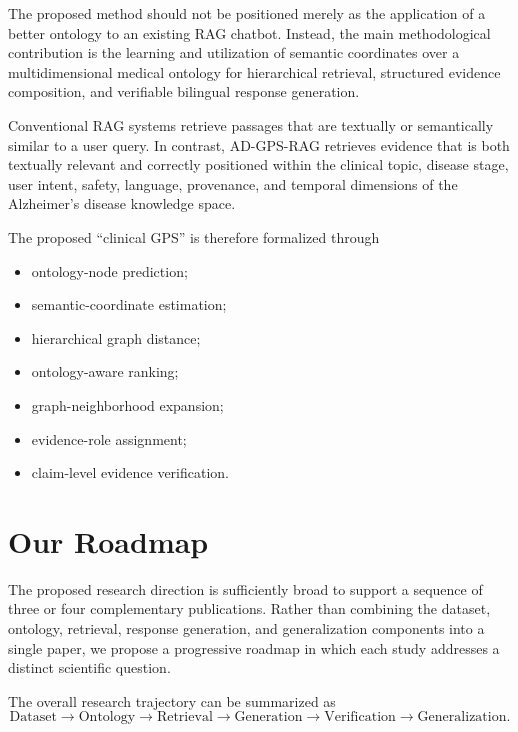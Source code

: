 \documentclass{article}
\begin{document}
The proposed method should not be positioned merely as the application of a better ontology to an existing RAG chatbot. Instead, the main methodological contribution is the learning and utilization of semantic coordinates over a multidimensional medical ontology for hierarchical retrieval, structured evidence composition, and verifiable bilingual response generation.

Conventional RAG systems retrieve passages that are textually or semantically similar to a user query. In contrast, AD-GPS-RAG retrieves evidence that is both textually relevant and correctly positioned within the clinical topic, 
disease stage, user intent, safety, language, provenance, and temporal dimensions of the Alzheimer's disease knowledge space.

The proposed ``clinical GPS'' is therefore formalized through
\begin{itemize}
    \item ontology-node prediction;
    \item semantic-coordinate estimation;
    \item hierarchical graph distance;
    \item ontology-aware ranking;
    \item graph-neighborhood expansion;
    \item evidence-role assignment;
    \item claim-level evidence verification.
\end{itemize}





\section{Our Roadmap}

The proposed research direction is sufficiently broad to support a sequence of three or four complementary publications. Rather than combining the dataset, ontology, retrieval, response generation, and generalization components into a single paper, we propose a progressive roadmap in which each study addresses a distinct scientific question.

The overall research trajectory can be summarized as
\begin{equation*}
    \mathrm{Dataset}
    \rightarrow
    \mathrm{Ontology}
    \rightarrow
    \mathrm{Retrieval}
    \rightarrow
    \mathrm{Generation}
    \rightarrow
    \mathrm{Verification}
    \rightarrow
    \mathrm{Generalization}.
\end{equation*}
\end{document}
